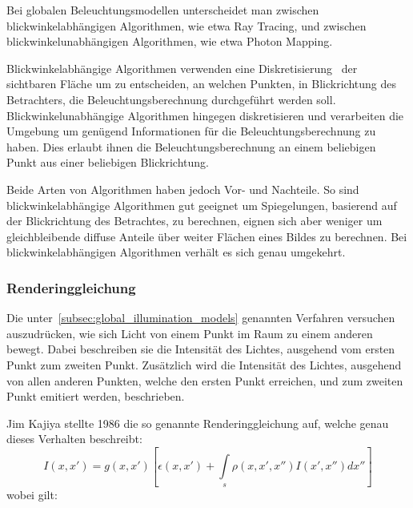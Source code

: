 Bei globalen Beleuchtungsmodellen unterscheidet man zwischen blickwinkelabhängigen Algorithmen, wie etwa Ray Tracing, und zwischen blickwinkelunabhängigen Algorithmen, wie etwa Photon Mapping.

Blickwinkelabhängige Algorithmen verwenden eine Diskretisierung~ der sichtbaren Fläche um zu entscheiden, an welchen Punkten, in Blickrichtung des Betrachters, die Beleuchtungsberechnung durchgeführt werden soll. Blickwinkelunabhängige Algorithmen hingegen diskretisieren und verarbeiten die Umgebung um genügend Informationen für die Beleuchtungsberechnung zu haben. Dies erlaubt ihnen die Beleuchtungsberechnung an einem beliebigen Punkt aus einer beliebigen Blickrichtung.

Beide Arten von Algorithmen haben jedoch Vor- und Nachteile. So sind blickwinkelabhängige Algorithmen gut geeignet um Spiegelungen, basierend auf der Blickrichtung des Betrachtes, zu berechnen, eignen sich aber weniger um gleichbleibende diffuse Anteile über weiter Flächen eines Bildes zu berechnen. Bei blickwinkelabhängigen Algorithmen verhält es sich genau umgekehrt.

\subsubsection{Renderinggleichung}
\label{ssubsec:rendering_equation}

Die unter~\ref{subsec:global_illumination_models} genannten Verfahren versuchen auszudrücken, wie sich Licht von einem Punkt im Raum zu einem anderen bewegt. Dabei beschreiben sie die Intensität des Lichtes, ausgehend vom ersten Punkt zum zweiten Punkt. Zusätzlich wird die Intensität des Lichtes, ausgehend von allen anderen Punkten, welche den ersten Punkt erreichen, und zum zweiten Punkt emitiert werden, beschrieben.

Jim Kajiya stellte 1986 die so genannte Renderinggleichung auf, welche genau dieses Verhalten beschreibt:
\begin{equation}
    I(x, x') = g(x, x')[\epsilon(x, x') + \int\limits_s\rho(x, x', x'')I(x', x'')dx'']
\end{equation}
wobei gilt:

